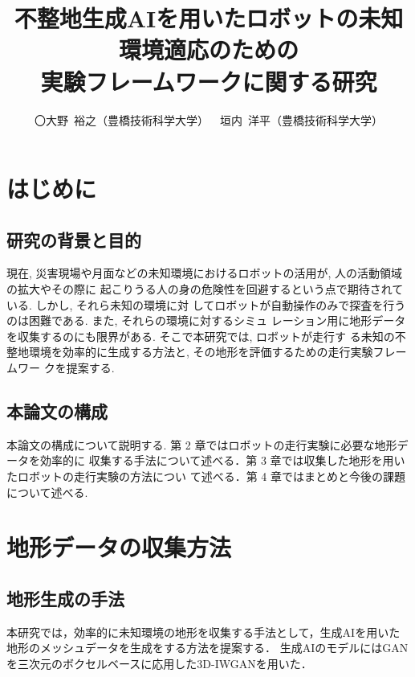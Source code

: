 \documentclass[uplatex,twocolumn, dvipdfmx]{jsarticle}  %
\begin{document}
\title{不整地生成AIを用いたロボットの未知環境適応のための\\実験フレームワークに関する研究}
\author{〇大野\ 裕之（豊橋技術科学大学）\ \ 垣内\ 洋平（豊橋技術科学大学）}
\setlength{\baselineskip}{4.4mm}	%
\maketitle
\thispagestyle{empty}
\pagestyle{empty}

\section{はじめに}
\subsection{研究の背景と目的}
現在, 災害現場や月面などの未知環境におけるロボットの活用が, 人の活動領域の拡大やその際に
起こりうる人の身の危険性を回避するという点で期待されている. しかし, それら未知の環境に対
してロボットが自動操作のみで探査を行うのは困難である. \cite{bunken1} また, それらの環境に対するシミュ
レーション用に地形データを収集するのにも限界がある. \cite{bunken2} そこで本研究では, ロボットが走行す
る未知の不整地環境を効率的に生成する方法と, その地形を評価するための走行実験フレームワー
クを提案する.

\subsection{本論文の構成}
本論文の構成について説明する. 第 2 章ではロボットの走行実験に必要な地形データを効率的に
収集する手法について述べる．第 3 章では収集した地形を用いたロボットの走行実験の方法につい
て述べる．第 4 章ではまとめと今後の課題について述べる.


\section{地形データの収集方法}
\subsection{地形生成の手法}
本研究では，効率的に未知環境の地形を収集する手法として，生成AIを用いた地形のメッシュデータを生成をする方法を提案する．
生成AIのモデルにはGANを三次元のボクセルベースに応用した3D-IWGANを用いた．\cite{bunken3}
\end{document}
